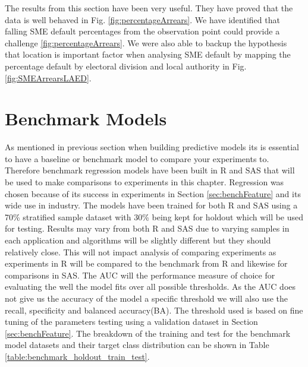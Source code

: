  
The results from this section have been very useful. They have proved that the data is well behaved in Fig. \ref{fig:percentageArrears}. We have identified that falling SME default percentages from the observation point could provide a challenge \ref{fig:percentageArrears}. We were also able to backup the hypothesis that location is important factor when analysing SME default by mapping the percentage default by electoral division and local authority in Fig. \ref{fig:SMEArrearsLAED}. 


\section{Benchmark Models}\label{sec:benchModels}
As mentioned in previous section when building predictive models its is essential to have a baseline or benchmark model to compare your experiments to. Therefore benchmark regression models have been built in R and SAS that will be used to make comparisons to experiments in this chapter. Regression was chosen because of its success in experiments in Section \ref{sec:benchFeature} and its wide use in industry. The models have been trained for both R and SAS using a 70\% stratified sample dataset with 30\% being kept for holdout which will be used for testing. Results may vary from both R and SAS due to varying samples in each application and algorithms will be slightly different but they should relatively close. This will not impact analysis of comparing experiments as experiments in R will be compared to the benchmark from R and likewise for comparisons in SAS. The AUC will the performance measure of choice for evaluating the well the model fits over all possible thresholds. As the AUC does not give us the accuracy of the model a specific threshold we will also use the recall, specificity and balanced accuracy(BA). The threshold used is based on fine tuning of the parameters testing using a validation dataset in Section \ref{sec:benchFeature}. The breakdown of the training and test for the benchmark model datasets and their target class distribution can be shown in Table \ref{table:benchmark_holdout_train_test}.

